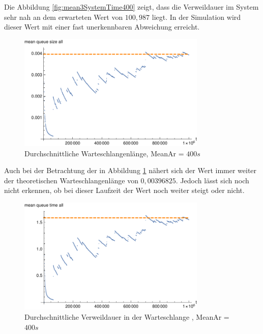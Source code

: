 Die Abbildung \ref{fig:mean3SystemTime400} zeigt, dass die Verweildauer im System sehr nah an dem erwarteten Wert von $100,987$ liegt. In der Simulation wird dieser Wert mit einer fast unerkennbaren Abweichung erreicht.

\begin{figure}[htpb]
	\centering
	\includegraphics[width=0.8\textwidth]{abbildungen/2_Phone_VIP/Arrival_400_Serve_100_dur_1000000_Skip_0/MeanQueueSizeAll.pdf}
	\caption{Durchschnittliche Warteschlangenlänge, MeanAr = $400s$}
	\label{fig:mean3QueueSize400}
\end{figure}

Auch bei der Betrachtung der in Abbildung \ref{fig:mean3QueueSize400} nähert sich der Wert immer weiter der theoretischen Warteschlangenlänge von $0,00396825$. Jedoch lässt sich noch nicht erkennen, ob bei dieser Laufzeit der Wert noch weiter steigt oder nicht.

\begin{figure}[htpb]
	\centering
	\includegraphics[width=0.8\textwidth]{abbildungen/2_Phone_VIP/Arrival_400_Serve_100_dur_1000000_Skip_0/MeanQueueTimeAll.pdf}
	\caption{Durchschnittliche Verweildauer in der Warteschlange , MeanAr = $400s$}
	\label{fig:mean3QueueTime400}
\end{figure}

